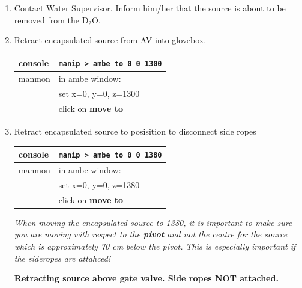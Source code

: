 \begin{enumerate}
\item \CheckBox[name=encp43]{} Contact Water Supervisor. Inform him/her that the source is
  about to be removed from the D$_{2}$O.
\item \CheckBox[name=encp44]{} Retract encapsulated source from AV into glovebox.
  \begin{center}
    \begin{tabular}{|l|l|}
      \hline
      console & \verb+manip > ambe to 0 0 1300+ \\
      \hline
      manmon & in ambe window: \\
      & set x=0, y=0, z=1300\\
      & click on {\bf move to} \\
      \hline
    \end{tabular}
  \end{center}
\item \CheckBox[name=encp44]{} Retract encapsulated source to posisition to disconnect side ropes
  \begin{center}
    \begin{tabular}{|l|l|}
      \hline
      console & \verb+manip > ambe to 0 0 1380+ \\
      \hline
      manmon & in ambe window: \\
      & set x=0, y=0, z=1380\\
      & click on {\bf move to} \\
      \hline
    \end{tabular}
  \end{center}
  {\it When moving the encapsulated source to 1380, it is important to make
    sure you are moving with respect to the {\bf pivot} and not the
    centre for the source which is approximately 70 cm below the
    pivot. This is especially important if the sideropes are
    attahced!}
  
  \begin{center} {\bf Retracting source above gate valve. Side ropes
      NOT attached.}
  \end{center}
  

\end{enumerate}
